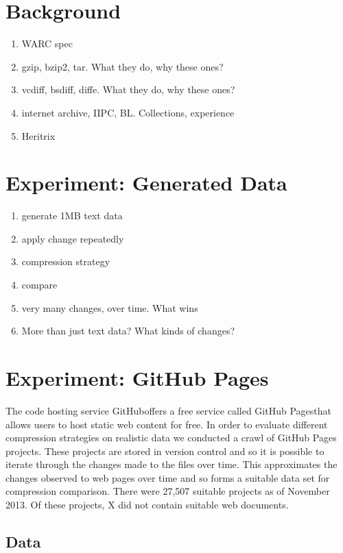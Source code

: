 \documentclass[11pt]{article}
\begin{document}
\section{Background}

\begin{enumerate}
\item WARC spec
\item gzip, bzip2, tar. What they do, why these ones?
\item vcdiff, bsdiff, diffe. What they do, why these ones?
\item internet archive, IIPC, BL. Collections, experience
\item Heritrix
\end{enumerate}

\section{Experiment: Generated Data}

\begin{enumerate}
\item generate 1MB text data
\item apply change repeatedly
\item compression strategy
\item compare
\item very many changes, over time. What wins
\item More than just text data? What kinds of changes?
\end{enumerate}

\section{Experiment: GitHub Pages}\label{section:exp:github}

The code hosting service GitHub\footnotemark offers a free service called GitHub Pages\footnotemark that allows users to host static web content for free. In order to evaluate different compression strategies on realistic data we conducted a crawl of GitHub Pages projects. These projects are stored in version control and so it is possible to iterate through the changes made to the files over time. This approximates the changes observed to web pages over time and so forms a suitable data set for compression comparison. There were 27,507 suitable projects as of November 2013. Of these projects, X did not contain suitable web documents.

\subsection{Data}
\end{document}
